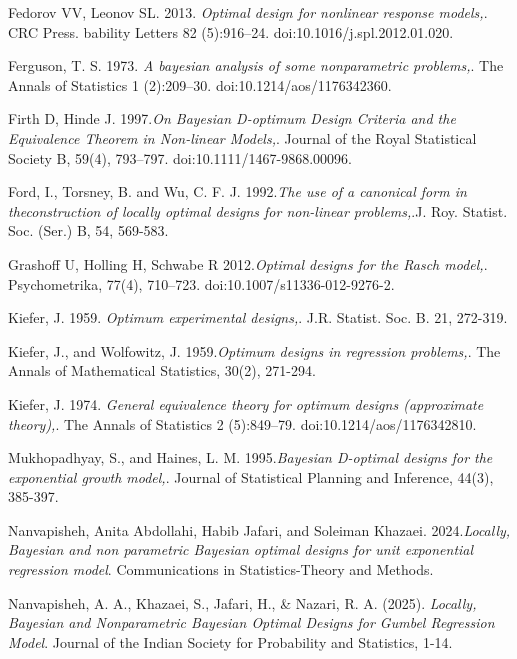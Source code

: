 \documentclass[twoside]{article}
\begin{document}
Fedorov VV, Leonov SL. 2013. {\it Optimal design for nonlinear response models,}. CRC Press. bability Letters 82 (5):916–24. doi:10.1016/j.spl.2012.01.020.


Ferguson, T. S. 1973. {\it A bayesian analysis of some nonparametric problems,}. The Annals of Statistics 1 (2):209–30. doi:10.1214/aos/1176342360.


Firth D, Hinde J. 1997.{\it On Bayesian D-optimum Design Criteria and the Equivalence Theorem in Non-linear Models,}. Journal of the Royal Statistical Society B, 59(4), 793–797. doi:10.1111/1467-9868.00096.




Ford, I., Torsney, B. and Wu, C. F. J. 1992.{\it The use of a canonical form in theconstruction of locally optimal designs for non-linear problems,}.J. Roy. Statist. Soc. (Ser.) B, 54, 569-583.


Grashoff U, Holling H, Schwabe R 2012.{\it Optimal designs for the Rasch model,}. Psychometrika, 77(4), 710–723. doi:10.1007/s11336-012-9276-2.


Kiefer, J. 1959. {\it Optimum experimental designs,}. J.R. Statist. Soc. B. 21, 272-319.



Kiefer, J., and Wolfowitz, J. 1959.{\it Optimum designs in regression problems,}. The Annals of Mathematical Statistics, 30(2), 271-294.


Kiefer, J. 1974. {\it General equivalence theory for optimum designs (approximate theory),}. The Annals of Statistics 2 (5):849–79. doi:10.1214/aos/1176342810.


Mukhopadhyay, S., and Haines, L. M. 1995.{\it Bayesian D-optimal designs for the exponential growth model,}. Journal of Statistical Planning and Inference, 44(3), 385-397.


Nanvapisheh, Anita Abdollahi, Habib Jafari, and Soleiman Khazaei. 2024.{\it Locally, Bayesian and non parametric Bayesian optimal designs for unit exponential regression model}. Communications in Statistics-Theory and Methods.

Nanvapisheh, A. A., Khazaei, S., Jafari, H., & Nazari, R. A. (2025). {\it Locally, Bayesian and Nonparametric Bayesian Optimal Designs for Gumbel Regression Model}. Journal of the Indian Society for Probability and Statistics, 1-14.
\end{document}

